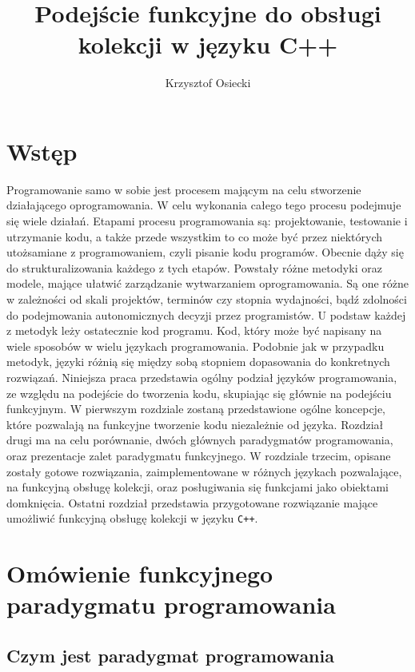 \documentclass[a4paper,10pt]{report}
\title{Podejście funkcyjne do obsługi kolekcji w języku C++}
\author{Krzysztof Osiecki}
\begin{document}
\pagestyle{fancy}\lhead{}\rightmark

\maketitle
\tableofcontents{}
\chapter*{Wstęp}
Programowanie samo w sobie jest procesem mającym na celu stworzenie działającego oprogramowania. W celu wykonania całego tego procesu podejmuje się wiele działań. Etapami procesu programowania są: projektowanie, testowanie i utrzymanie kodu, a także przede wszystkim to co może być przez niektórych utożsamiane z programowaniem, czyli pisanie kodu programów. Obecnie dąży się do strukturalizowania każdego z tych etapów. Powstały różne metodyki oraz modele, mające ułatwić zarządzanie wytwarzaniem oprogramowania. Są one różne w zależności od skali projektów, terminów czy stopnia wydajności, bądź zdolności do podejmowania autonomicznych decyzji przez programistów. U podstaw każdej z metodyk leży ostatecznie kod programu. Kod, który może być napisany na wiele sposobów w wielu językach programowania. Podobnie jak w przypadku metodyk, języki różnią się między sobą stopniem dopasowania do konkretnych rozwiązań. Niniejsza praca przedstawia ogólny podział języków programowania, ze względu na podejście do tworzenia kodu, skupiając się głównie na podejściu funkcyjnym. W pierwszym rozdziale zostaną przedstawione ogólne koncepcje, które pozwalają na funkcyjne tworzenie kodu niezależnie od języka. Rozdział drugi ma na celu porównanie, dwóch głównych paradygmatów programowania, oraz prezentacje zalet paradygmatu funkcyjnego. W rozdziale trzecim, opisane zostały gotowe rozwiązania, zaimplementowane w różnych językach pozwalające, na funkcyjną obsługę kolekcji, oraz posługiwania się funkcjami jako obiektami domknięcia. Ostatni rozdział przedstawia przygotowane rozwiązanie mające umożliwić funkcyjną obsługę kolekcji w języku \verb|C++|. 
\chapter{Omówienie funkcyjnego paradygmatu programowania}
\section{Czym jest paradygmat programowania}
\end{document}
